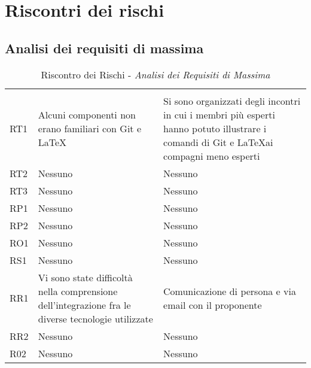 \appendix
\section{Riscontri dei rischi}
\label{sec:rischi}
\subsection{Analisi dei requisiti di massima}
\begin{table}[H]
	\centering
	\begin{tabular}{|C{2.5cm}|C{5cm}|C{5cm}|}
		 & & \\
		RT1  & Alcuni componenti non erano familiari con Git e \LaTeX & Si sono organizzati degli incontri in cui i membri più esperti hanno potuto illustrare i comandi di Git e \LaTeX ai compagni meno esperti \\
		\hline
		RT2  & Nessuno & Nessuno \\
		\hline
		RT3  & Nessuno & Nessuno \\
		\hline
		RP1  & Nessuno & Nessuno \\
		\hline
		RP2  & Nessuno & Nessuno \\
		\hline
		RO1  & Nessuno & Nessuno \\
		\hline
		RS1  & Nessuno & Nessuno \\
		\hline
		RR1  & Vi sono state difficoltà nella comprensione dell'integrazione fra le diverse tecnologie utilizzate & Comunicazione di persona e via email con il proponente \\
		\hline
		RR2  & Nessuno & Nessuno \\
		\hline
		R02  & Nessuno & Nessuno \\
		\hline
	\end{tabular}
	\caption{Riscontro dei Rischi - \textit{Analisi dei Requisiti di Massima}}
\end{table}

